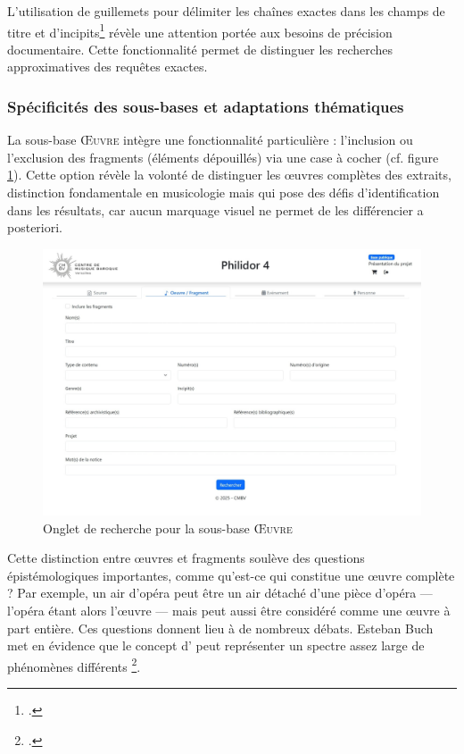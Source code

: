 L'utilisation de guillemets pour délimiter les chaînes exactes dans les champs de titre et d'incipits\footcite{BaseDonneesPHILIDOR42024} révèle une attention portée aux besoins de précision documentaire. Cette fonctionnalité permet de distinguer les recherches approximatives des requêtes exactes.

\subsubsection{Spécificités des sous-bases et adaptations thématiques}

La sous-base \textsc{Œuvre} intègre une fonctionnalité particulière : l'inclusion ou l'exclusion des fragments (éléments dépouillés) via une case à cocher (cf. figure \ref{formulaire_oeuvre}). Cette option révèle la volonté de distinguer les œuvres complètes des extraits, distinction fondamentale en musicologie mais qui pose des défis d'identification dans les résultats, car aucun marquage visuel ne permet de les différencier a posteriori.

\begin{figure}[h]
	\caption{Onglet de recherche pour la sous-base \textsc{Œuvre}} \label{formulaire_oeuvre}
	\centering
	\includegraphics[width=\textwidth]{images/Capture_ecran_onglet_oeuvres_philidor4.jpeg}
\end{figure}

Cette distinction entre œuvres et fragments soulève des questions épistémologiques importantes, comme qu'est-ce qui constitue une œuvre complète ? Par exemple, un air d'opéra peut être un air détaché d'une pièce d'opéra --- l'opéra étant alors l'œuvre --- mais peut aussi être considéré comme une œuvre à part entière. Ces questions donnent lieu à de nombreux débats. Esteban Buch met en évidence que le concept d' peut représenter un spectre assez large de phénomènes différents \footcite{buchRelireIngardenOntologie2013}.

